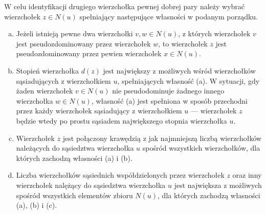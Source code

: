 {\begin{definition}
    W celu identyfikacji drugiego wierzchołka pewnej dobrej pary należy wybrać wierzchołek $z \in N(u)$ spełniający następujące własności w podanym porządku.
    \begin{enumerate}[(a)]
      \item Jeżeli istnieją pewne dwa wierzchołki $v,w \in N(u)$, z których wierzchołek $v$ jest pseudozdominowany przez wierzchołek $w$, to wierzchołek $z$ jest pseudozdominowany przez pewien wierzchołek $x \in N(u)$.
      \item Stopień wierzchołka $d(z)$ jest największy z możliwych wśród wierzchołków sąsiadujących z wierzchołkiem $u$, spełniających własność (a).
      W sytuacji, gdy żaden wierzchołek $v \in N(u)$ nie pseudodominuje żadnego innego wierzchołka $w \in N(u)$, własność (a) jest spełniona w sposób przechodni przez każdy wierzchołek sąsiadujący z wierzchołkiem $u$ --- wierzchołek $z$ będzie wtedy po prostu sąsiadem największego stopnia wierzchołka $u$.
      \item Wierzchołek $z$ jest połączony krawędzią z jak najmniejszą liczbą wierzchołków należących do sąsiedztwa wierzchołka $u$ spośród wszystkich wierzchołków, dla których zachodzą własności (a) i (b).
      \item Liczba wierzchołków sąsiednich współdzielonych przez wierzchołek $z$ oraz inny wierzchołek nalężący do sąsiedztwa wierzchołka $u$ jest największa z możliwych spośród wszystkich elementów zbioru $N(u)$, dla których zachodzą własności (a), (b) i (c).
    \end{enumerate}
  \end{definition}
}
